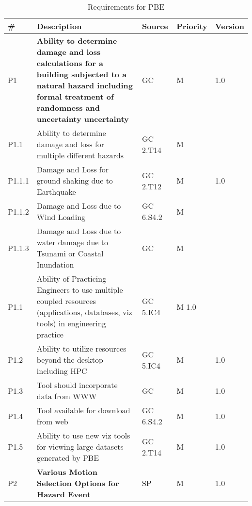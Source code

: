 \begin{longtable}{| p{} | p{} | p{} | p{} |  p{} |}

\caption{Requirements for PBE}
  \label{tab:featureRequirements}   
    \\
   \hline
\rowcolor{lightgray}
      \# & Description & Source & Priority & Version \\ \hline
      
      P1 & \textbf{Ability to determine damage and loss calculations for a building subjected to a natural hazard including formal treatment of randomness and uncertainty uncertainty} & GC & M  & 1.0  \\ \hline
      P1.1 & Ability to determine  damage and loss for multiple different hazards & GC 2.T14 & M &  \\ \hline
      P1.1.1 & Damage and Loss for ground shaking due to Earthquake & GC 2.T12 & M & 1.0 \\ \hline
      P1.1.2 & Damage and Loss due to Wind Loading & GC 6.S4.2 & M &  \\ \hline
      P1.1.3 & Damage and Loss due to water damage due to Tsunami or Coastal Inundation & GC & M &  \\ \hline
     P1.1 & Ability of Practicing Engineers to use multiple coupled resources (applications, databases, viz tools) in engineering practice & GC 5.IC4 & M 1.0 & \\ \hline
P1.2 & Ability to utilize resources beyond the desktop including HPC & GC 5.IC4 & M & 1.0 \\ \hline
P1.3 & Tool should incorporate data from WWW & GC & M & 1.0 \\ \hline
P1.4 & Tool available for download from web & GC 6.S4.2& M & 1.0 \\ \hline
P1.5 & Ability to use new viz tools for viewing large datasets generated by PBE & GC 2.T14 & M & 1.0 \\ \hhline{=====}
P2 & \textbf{Various Motion Selection Options for Hazard Event} & SP & M & 1.0  \\ \hline


\end{longtable}
